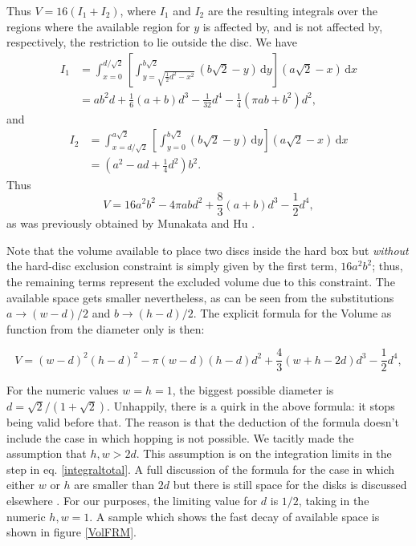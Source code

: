 \documentclass[a4paper,10pt]{article}
\newcommand{\rd}{\, \mathrm{d}}
\begin{document}
Thus $V = 16(I_1 + I_2)$, where $I_1$ and $I_2$ are the resulting integrals over the regions where the available region for $y$ is affected by, and is not affected by, respectively, the restriction to lie outside the disc.
We have
\begin{align}
 I_1 &= \int_{x=0}^{d / \sqrt{2}} \left[ \int_{y = \sqrt{\frac{1}{2} {d^2} - x^2}}^{b \sqrt{2}} \left( b \sqrt{2} - y \right) \rd y \right]  \left( a \sqrt{2} - x \right) \rd x \\
&= 	
a b^{2} d + \textstyle \frac{1}{6} (a+b) d^{3} - \frac{1}{32}  d^{4} - \frac{1}{4} {\left(\pi a b + b^{2}\right)} d^{2},
\end{align}
and
\begin{align}
 I_2 &= \int_{x=d / \sqrt{2}}^{a \sqrt{2}} \left[ \int_{y = 0}^{b \sqrt{2}} \left( b \sqrt{2} - y \right) \rd y \right]  \left( a \sqrt{2} - x \right) \rd x \\
&=	
{\left( a^{2} - a d + \textstyle \frac{1}{4}  d^{2}\right)} b^{2}.
\end{align}
Thus 
\begin{equation}\label{volumeabd}
 V %
= 16 a^{2} b^{2}  - 4 \pi a b d^{2} + \textstyle \frac{8}{3} (a+b) d^{3}  - \frac{1}{2} d^{4},
\end{equation}
as was previously obtained by Munakata and Hu \cite{Munakata02}.

Note that the volume available to place two discs inside 
the hard box but \emph{without} the 
 hard-disc exclusion constraint is simply 
given by the first term, $16 a^2 b^2$; 
thus, the remaining terms represent the excluded volume due to this constraint.
The available space gets smaller nevertheless, as can be seen from
the substitutions $a\rightarrow (w-d)/2$ and $b\rightarrow (h-d)/2$.
The explicit formula for the Volume as function from the diameter only is then:

\begin{equation}\label{volumewhd}
 V 
= (w-d)^{2} (h-d)^{2}  - 
 \pi (w-d)(h-d) d^{2} + 
\textstyle \frac{4}{3} (w+h-2d) d^{3}  
- \frac{1}{2} d^{4},
\end{equation}
 
For the numeric values $w=h=1$, the biggest possible diameter is 
$d=\sqrt{2}/(1+\sqrt{2})$. Unhappily, there is a quirk in the above formula:
it stops being valid before that. The reason is that the deduction
of the formula doesn't include the case in which hopping is not possible. 
We tacitly made the assumption that $h,w>2d$.  This assumption is on 
the integration limits in the step in eq. \ref{integraltotal}. 
A full discussion of the formula for the case in which either
$w$ or $h$ are smaller than $2d$ but there is still space for
the disks is discussed elsewhere \cite{notascalculokarel}. For our purposes,
the limiting value for $d$ is $1/2$, taking in the numeric $h,w=1$.  
A sample which shows the fast decay of available space is shown in 
figure  \ref{VolFRM}.
\end{document}
